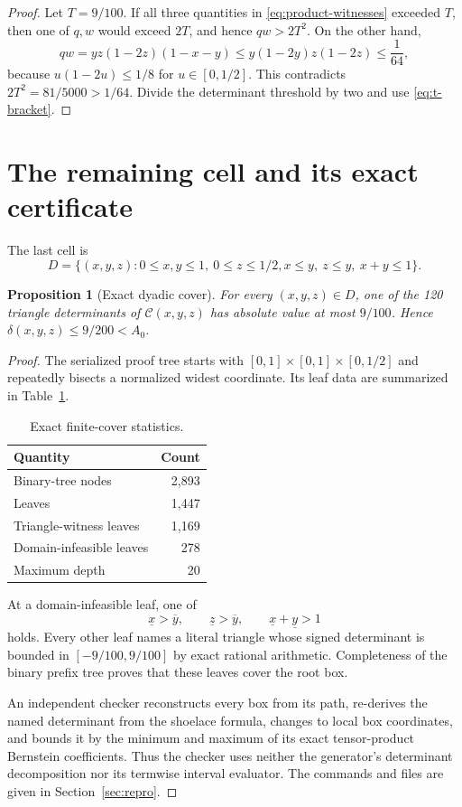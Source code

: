 \documentclass[11pt]{amsart}
\newtheorem{proposition}[theorem]{Proposition}
\theoremstyle{definition}
\newcommand{\CY}{\mathcal C}
\begin{document}
\begin{proof}
Let $T=9/100$.  If all three quantities in
\eqref{eq:product-witnesses} exceeded $T$, then one of $q,w$ would exceed
$2T$, and hence $qw>2T^2$.  On the other hand,
\[
 qw=yz(1-2z)(1-x-y)
 \le y(1-2y)z(1-2z)\le\frac1{64},
\]
because $u(1-2u)\le1/8$ for $u\in[0,1/2]$.  This contradicts
$2T^2=81/5000>1/64$.  Divide the determinant threshold by two and use
\eqref{eq:t-bracket}.
\end{proof}

\section{The remaining cell and its exact certificate}

The last cell is
\begin{equation}\label{eq:D}
D=\{(x,y,z):0\le x,y\le1,\ 0\le z\le1/2,
x\le y,\ z\le y,\ x+y\le1\}.
\end{equation}

\begin{proposition}[Exact dyadic cover]\label{prop:cover}
For every $(x,y,z)\in D$, one of the 120 triangle determinants of
$\CY(x,y,z)$ has absolute value at most $9/100$.  Hence
$\delta(x,y,z)\le9/200<A_0$.
\end{proposition}

\begin{proof}
The serialized proof tree starts with
$[0,1]\times[0,1]\times[0,1/2]$ and repeatedly bisects a normalized widest
coordinate.  Its leaf data are summarized in Table~\ref{tab:cover}.

\begin{table}[ht]
\centering
\caption{Exact finite-cover statistics.}\label{tab:cover}
\begin{tabular}{lr}
\toprule
Quantity & Count\\
\midrule
Binary-tree nodes & 2,893\\
Leaves & 1,447\\
Triangle-witness leaves & 1,169\\
Domain-infeasible leaves & 278\\
Maximum depth & 20\\
\bottomrule
\end{tabular}
\end{table}

At a domain-infeasible leaf, one of
\[
 \underline x>\overline y,
 \qquad \underline z>\overline y,
 \qquad \underline x+\underline y>1
\]
holds.  Every other leaf names a literal triangle whose signed determinant is
bounded in $[-9/100,9/100]$ by exact rational arithmetic.  Completeness of the
binary prefix tree proves that these leaves cover the root box.

An independent checker reconstructs every box from its path, re-derives the
named determinant from the shoelace formula, changes to local box coordinates,
and bounds it by the minimum and maximum of its exact tensor-product Bernstein
coefficients.  Thus the checker uses neither the generator's determinant
decomposition nor its termwise interval evaluator.  The commands and files
are given in Section~\ref{sec:repro}.
\end{proof}
\end{document}
